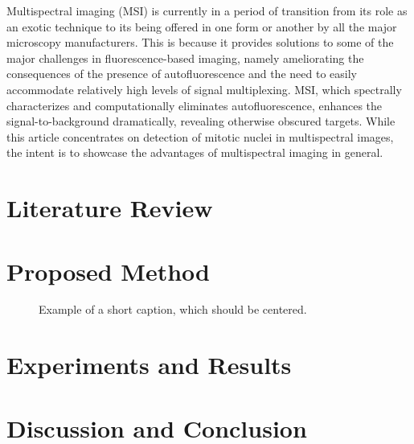 \documentclass[10pt,twocolumn,letterpaper]{article}
\begin{document}
Multispectral imaging (MSI) is currently in a period of transition from its role as an exotic technique to its being offered in one form or another by all the major microscopy manufacturers. This is because it provides solutions to some of the major challenges in fluorescence-based imaging, namely ameliorating the consequences of the presence of autofluorescence and the need to easily accommodate relatively high levels of signal multiplexing. MSI, which spectrally characterizes and computationally eliminates autofluorescence, enhances the signal-to-background dramatically, revealing otherwise obscured targets. While this article concentrates on detection of mitotic nuclei in multispectral images, the intent is to showcase the advantages of multispectral imaging in general. 

\section{Literature Review}


\section{Proposed Method}

\begin{figure*}
\begin{center}
\fbox{\rule{0pt}{2in} \rule{.9\linewidth}{0pt}}
\end{center}
   \caption{Example of a short caption, which should be centered.}
\label{fig:short}
\end{figure*}

\section{Experiments and Results}

\section{Discussion and Conclusion}

{\small


}
\end{document}
